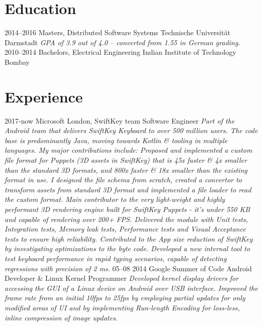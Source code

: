 \documentclass[]{friggeri-cv}
\begin{document}
\section{Education}
    \begin{entrylist}
        \entry
            {2014–2016}
            {Masters, {\normalfont Distributed Software Systems}}
            {Technische Universität Darmstadt}
            {\emph{GPA of 3.9 out of 4.0 -- converted from 1.55 in German grading.}}
        \entry
            {2010–2014}
            {Bachelors, {\normalfont Electrical Engineering}}
            {Indian Institute of Technology Bombay}
            {}%
    \end{entrylist}
    \vspace{-0.3cm}

\section{Experience}
    \begin{entrylist}
        \entry
            {2017-now}
            {Microsoft London, SwiftKey team}
            {Software Engineer}
            {\emph{Part of the Android team that delivers SwiftKey Keyboard to over 500 million users. The code base is predominantly Java, moving towards Kotlin \& tooling in multiple languages. My major contributions include:
	    \newline 
	    \newline
	    Proposed and implemented a custom file format for Puppets (3D assets in SwiftKey) that is 45x faster \& 4x smaller than the standard 3D formats, and 800x faster \& 18x smaller than the existing format in use. I designed the file schema from scratch, created a convertor to transform assets from standard 3D format and implemented a file loader to read the custom format.
            \newline
            \newline
	    Main contributor to the very light-weight and highly performant 3D rendering engine built for SwiftKey Puppets - it's under 550 KB and capable of rendering over 200+ FPS. Delivered the module with Unit tests, Integration tests, Memory leak tests, Performance tests and Visual Acceptance tests to ensure high reliability.   
            \newline
            \newline
            Contributed to the App size reduction of SwiftKey by investigating optimizations to the byte code. Developed a new internal tool to test keyboard performance in rapid typing scenarios, capable of detecting regressions with precision of 2 ms. }}
        \entry
            {05–08 2014}
            {Google Summer of Code}
            {Android Developer \& Linux Kernel Programmer}
            {\emph{Developed kernel display drivers for accessing the GUI of a Linux device on Android over USB interface. Improved the frame rate from an initial 10fps to 25fps by employing partial updates for only modified areas of UI and by implementing Run-length Encoding for loss-less, inline compression of image updates.}}
    \end{entrylist}
\end{document}
